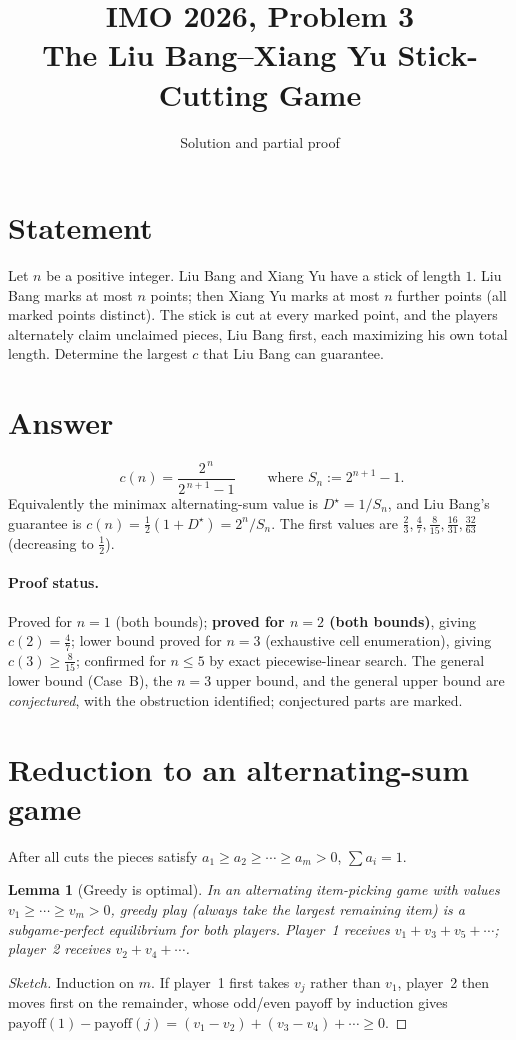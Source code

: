 \documentclass[11pt]{article}
\title{IMO 2026, Problem 3 \\[2pt]
\large The Liu Bang--Xiang Yu Stick-Cutting Game}
\author{Solution and partial proof}
\date{}
\newtheorem{lemma}{Lemma}
\theoremstyle{remark}\newtheorem*{remark}{Remark}
\newcommand{\Sn}{S_{n}}
\newcommand{\Dstar}{D^{\star}}
\begin{document}
\maketitle

\section*{Statement}
Let $n$ be a positive integer. Liu Bang and Xiang Yu have a stick of length $1$.
Liu Bang marks at most $n$ points; then Xiang Yu marks at most $n$ further points
(all marked points distinct). The stick is cut at every marked point, and the
players alternately claim unclaimed pieces, Liu Bang first, each maximizing his
own total length. Determine the largest $c$ that Liu Bang can guarantee.

\section*{Answer}
\[
\boxed{\;c(n)=\dfrac{2^{\,n}}{2^{\,n+1}-1}\;}\qquad
\text{where } \Sn:=2^{n+1}-1.
\]
Equivalently the minimax alternating-sum value is $\Dstar=1/\Sn$, and Liu Bang's
guarantee is $c(n)=\tfrac12(1+\Dstar)=2^n/\Sn$. The first values are
$\tfrac23,\tfrac47,\tfrac{8}{15},\tfrac{16}{31},\tfrac{32}{63}$ (decreasing to
$\tfrac12$).

\paragraph{Proof status.} Proved for $n=1$ (both bounds); \textbf{proved for
$n=2$ (both bounds)}, giving $c(2)=\tfrac47$; lower bound proved for $n=3$
(exhaustive cell enumeration), giving $c(3)\ge\tfrac{8}{15}$; confirmed for
$n\le5$ by exact piecewise-linear search. The general lower bound (Case~B),
the $n=3$ upper bound, and the general upper bound are \emph{conjectured}, with
the obstruction identified; conjectured parts are marked.

\section{Reduction to an alternating-sum game}

After all cuts the pieces satisfy $a_1\ge a_2\ge\cdots\ge a_m>0$, $\sum a_i=1$.

\begin{lemma}[Greedy is optimal]\label{lem:greedy}
In an alternating item-picking game with values $v_1\ge\cdots\ge v_m>0$, greedy play
(always take the largest remaining item) is a subgame-perfect equilibrium for both
players. Player~1 receives $v_1+v_3+v_5+\cdots$; player~2 receives $v_2+v_4+\cdots$.
\end{lemma}
\begin{proof}[Sketch]
Induction on $m$. If player~1 first takes $v_j$ rather than $v_1$, player~2 then
moves first on the remainder, whose odd/even payoff by induction gives
$\text{payoff}(1)-\text{payoff}(j)=(v_1-v_2)+(v_3-v_4)+\cdots\ge0$.
\end{proof}
\end{document}
